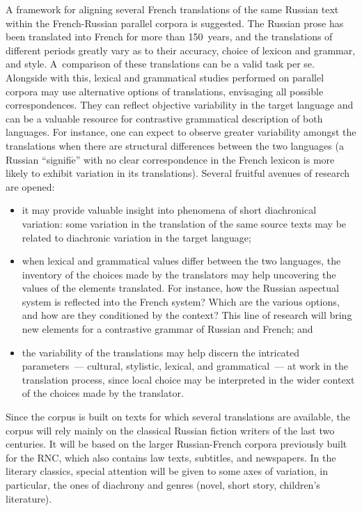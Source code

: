 \begin{multicols}{2}
\noindent
A framework for aligning several French translations of the same Russian text within 
the French-Russian parallel corpora is suggested. The Russian prose has been translated into French for more 
than 150~years, and the translations of different periods greatly vary as to their accuracy, choice of 
lexicon and grammar, and style. A~comparison of these translations can be a valid task per se. 
Alongside with this, lexical and grammatical studies performed on parallel corpora may use 
alternative options of translations, envisaging all possible correspondences. They can reflect 
objective variability in the target language and can be a valuable resource for contrastive 
grammatical description of both languages. For instance, one can expect to observe greater 
variability amongst the translations when there are structural differences between the two languages 
(a Russian ``signifi$\acute{\mbox{e}}$'' with no clear correspondence in the French lexicon is 
more likely to exhibit variation in its translations). Several fruitful avenues of research are opened:
\begin{itemize}
     \item  it may provide valuable insight into phenomena of short diachronical variation: some 
variation in the translation of the same source texts may be related to diachronic variation in the 
target language;
\item  when lexical and grammatical values differ between the two languages, the inventory of the 
choices made by the translators may help uncovering the values of the elements translated. For 
instance, how the Russian aspectual system is reflected into the French system? Which are the 
various options, and how are they conditioned by the context? This line of research will bring new 
elements for a contrastive grammar of Russian and French; and
     \item the variability of the translations may help discern the intricated parameters~--- cultural, 
stylistic, lexical, and grammatical~--- at work in the translation process, since local choice may be 
interpreted in the wider context of the choices made by the translator.
     \end{itemize}
     
   Since the corpus is built on texts for which several translations are available, the corpus will rely 
mainly on the classical Russian fiction writers of the last two centuries. It will be based on the 
larger Russian-French corpora previously built for the RNC, which also contains law texts, 
subtitles, and newspapers. In the literary classics, special attention will be given to some axes of 
variation, in particular, the ones of diachrony and genres (novel, short story, children's literature).
   

\end{multicols}
